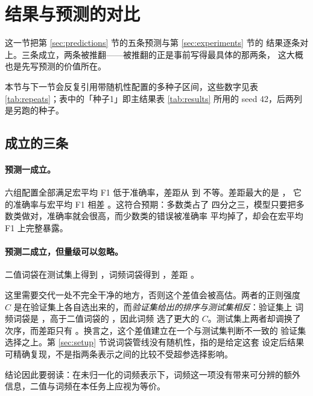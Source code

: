 \documentclass[11pt]{article}
\begin{document}
\section{结果与预测的对比}\label{sec:comparison}

这一节把第 \ref{sec:predictions} 节的五条预测与第 \ref{sec:experiments} 节的
结果逐条对上。三条成立，两条被推翻——被推翻的正是事前写得最具体的那两条，
这大概也是先写预测的价值所在。

本节与下一节会反复引用带随机性配置的多种子区间，这些数字见表
\ref{tab:repeats}；表中的「种子1」即主结果表 \ref{tab:results} 所用的
seed 42，后两列是另跑的种子。



\subsection{成立的三条}

\paragraph{预测一成立。} 六组配置全部满足宏平均 F1 低于准确率，差距从
\resultGapMin{} 到 \resultGapMax{} 不等。差距最大的是 \resultGapMaxName{}，
它的准确率与宏平均 F1 相差 \resultGapMax{}。这符合预期：多数类占了
四分之三，模型只要把多数类做对，准确率就会很高，而少数类的错误被准确率
平均掉了，却会在宏平均 F1 上完整暴露。

\paragraph{预测二成立，但量级可以忽略。} 二值词袋在测试集上得到
\resultBowFOne{}，词频词袋得到 \resultBowFOneFreq{}，差距 \resultBowPairDiff{}。

这里需要交代一处不完全干净的地方，否则这个差值会被高估。两者的正则强度
$C$ 是在验证集上各自选出来的，而\emph{验证集给出的排序与测试集相反}：验证集上
词频词袋是 \resultBowValFreq{}，高于二值词袋的 \resultBowValBin{}，因此词频
选了更大的 $C$。测试集上两者却调换了次序，而差距只有
\resultBowPairDiff{}。换言之，这个差值建立在一个与测试集判断不一致的
验证集选择之上。第 \ref{sec:setup} 节说词袋管线没有随机性，指的是给定这套
设定后结果可精确复现，不是指两条表示之间的比较不受超参选择影响。

结论因此要弱读：在未归一化的词频表示下，词频这一项没有带来可分辨的额外
信息，二值与词频在本任务上应视为等价。
\end{document}

